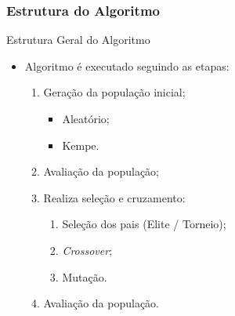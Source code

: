 \documentclass[compress, hide notes]{beamer}
\let\olditem=\item%
\renewcommand{\item}{\olditem \justifying}%
\begin{document}
			\subsubsection{Estrutura do Algoritmo}
			\begin{frame}{Estrutura Geral do Algoritmo}
				
				\begin{itemize}
					
					\item Algoritmo é executado seguindo as etapas:
					
					\bigskip
					
					\begin{enumerate}
						\item Geração da população inicial;

						\begin{itemize}
							\item Aleatório;
                            \bigskip
							\item Kempe.
						\end{itemize}
						
						\bigskip
						\bigskip
						
						\item Avaliação da população;
						
						\bigskip
						\bigskip
						
						\item Realiza seleção e cruzamento:

						\begin{enumerate}
                        
							\item Seleção dos pais (Elite / Torneio);
							
							\bigskip
							
							\item \textit{Crossover};
							
							\bigskip
							
							\item Mutação.
						\end{enumerate}
						
						\bigskip
						\bigskip
						
						\item Avaliação da população.
					\end{enumerate}
				\end{itemize}
			\end{frame}
			
\end{document}
